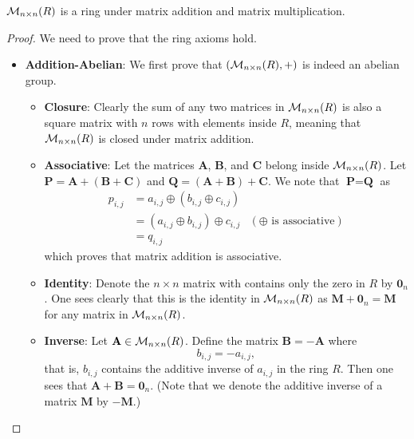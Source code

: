 \begin{proposition}
    $\mathcal{M}_{n\times n}(R)$ is a ring under matrix addition and matrix multiplication.
\end{proposition}
\begin{proof}
    We need to prove that the ring axioms hold.
    \begin{itemize}
        \item \textbf{Addition-Abelian}: We first prove that $(\mathcal{M}_{n\times n}(R), +)$ is indeed an abelian group.
        \begin{itemize}
            \item \textbf{Closure}: Clearly the sum of any two matrices in $\mathcal{M}_{n\times n}(R)$ is also a square matrix with $n$ rows with elements inside $R$, meaning that $\mathcal{M}_{n\times n}(R)$ is closed under matrix addition.

            \item \textbf{Associative}: Let the matrices $\textbf{A}$, $\textbf{B}$, and $\textbf{C}$ belong inside $\mathcal{M}_{n\times n}(R)$. Let $\textbf{P} = \textbf{A} + (\textbf{B} + \textbf{C})$ and $\textbf{Q} = (\textbf{A} + \textbf{B}) + \textbf{C}$. We note that $\textbf{P} = \textbf{Q}$ as
            \begin{align*}
                p_{i,j} &= a_{i,j} \oplus (b_{i,j} \oplus c_{i,j})\\
                &= (a_{i,j} \oplus b_{i,j}) \oplus c_{i,j} & (\oplus\text{ is associative})\\
                &= q_{i,j}
            \end{align*}
            which proves that matrix addition is associative.
    
            \item \textbf{Identity}: Denote the $n \times n$ matrix with contains only the zero in $R$ by $\textbf{0}_n$. One sees clearly that this is the identity in $\mathcal{M}_{n\times n}(R)$ as $\textbf{M} + \textbf{0}_n = \textbf{M}$ for any matrix in $\mathcal{M}_{n\times n}(R)$.
            
            \item \textbf{Inverse}: Let $\textbf{A} \in \mathcal{M}_{n\times n}(R)$. Define the matrix $\textbf{B} = -\textbf{A}$ where
            \[
                b_{i,j} = -a_{i,j},    
            \]
            that is, $b_{i,j}$ contains the additive inverse of $a_{i,j}$ in the ring $R$. Then one sees that $\textbf{A} + \textbf{B} = \textbf{0}_n$.\newline
            (Note that we denote the additive inverse of a matrix $\textbf{M}$ by $-\textbf{M}$.)


\end{itemize}
\end{itemize}
\end{proof}
